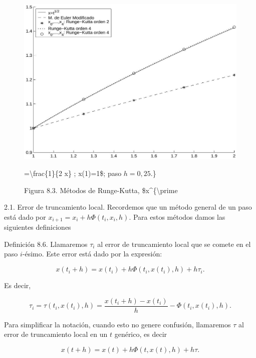 \documentclass[10pt]{article}
\begin{document}
\begin{figure}[h]
\begin{center}
  \includegraphics[width=\textwidth]{2025_09_05_3888c9ac96bd653d96b4g-182}
\captionsetup{labelformat=empty}
\caption{Figura 8.3. Métodos de Runge-Kutta, \$x\^{}\{\textbackslash prime}=\textbackslash frac\{1\}\{2 x\} ; x(1)=1\$; paso $h=0,25$.\}\end{center}
\end{figure}

2.1. Error de truncamiento local. Recordemos que un método general de un paso está dado por $x_{i+1}=x_{i}+h \Phi\left(t_{i}, x_{i}, h\right)$. Para estos métodos damos las siguientes definiciones

Definición 8.6. Llamaremos $\tau_{i}$ al error de truncamiento local que se comete en el paso $i$-ésimo. Este error está dado por la expresión:


\begin{equation*}
x\left(t_{i}+h\right)=x\left(t_{i}\right)+h \Phi\left(t_{i}, x\left(t_{i}\right), h\right)+h \tau_{i} . \tag{8.16}
\end{equation*}


Es decir,

$$
\tau_{i}=\tau\left(t_{i}, x\left(t_{i}\right), h\right)=\frac{x\left(t_{i}+h\right)-x\left(t_{i}\right)}{h}-\Phi\left(t_{i}, x\left(t_{i}\right), h\right) .
$$

Para simplificar la notación, cuando esto no genere confusión, llamaremos $\tau$ al error de truncamiento local en un $t$ genérico, es decir

$$
x(t+h)=x(t)+h \Phi(t, x(t), h)+h \tau .
$$
\end{document}
